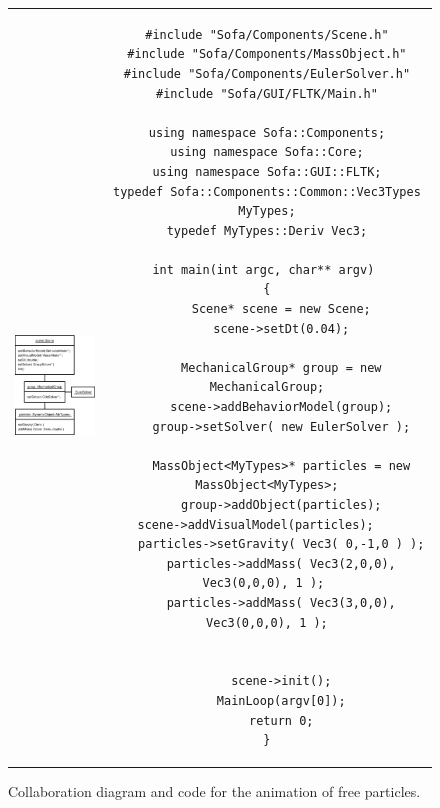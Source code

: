 \begin{figure}[htp]
\begin{center} \begin{tabular}{cc}
\begin{minipage}[b]{7cm}
	\includegraphics*[width=6cm]{fig/singleParticleCollaboration.eps}  
\end{minipage}
 &
\begin{minipage}[b]{8cm} 
{\scriptsize
\begin{verbatim}
#include "Sofa/Components/Scene.h"
#include "Sofa/Components/MassObject.h"
#include "Sofa/Components/EulerSolver.h"
#include "Sofa/GUI/FLTK/Main.h"

using namespace Sofa::Components;
using namespace Sofa::Core;
using namespace Sofa::GUI::FLTK;
typedef Sofa::Components::Common::Vec3Types MyTypes;
typedef MyTypes::Deriv Vec3;
        
int main(int argc, char** argv) 
{
    Scene* scene = new Scene;
    scene->setDt(0.04);
    
    MechanicalGroup* group = new MechanicalGroup;
    scene->addBehaviorModel(group);
    group->setSolver( new EulerSolver );
    
    MassObject<MyTypes>* particles = new MassObject<MyTypes>;
    group->addObject(particles);
    scene->addVisualModel(particles);                 
    particles->setGravity( Vec3( 0,-1,0 ) );
    particles->addMass( Vec3(2,0,0), Vec3(0,0,0), 1 ); 
    particles->addMass( Vec3(3,0,0), Vec3(0,0,0), 1 );


    scene->init();
    MainLoop(argv[0]);
    return 0;
}
 \end{verbatim} 
}

\end{minipage}
\end{tabular}
\end{center}
\label{fig:singleParticleCollaboration} 
\caption{Collaboration diagram and code for the animation of free particles.}
\end{figure}

